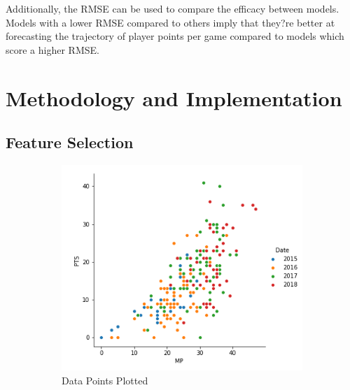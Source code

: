 \documentclass[a4paper,11pt,twoside]{article}
\begin{document}
Additionally, the RMSE can be used to compare the efficacy between models. Models with a lower RMSE compared to others imply that they?re better at forecasting the trajectory of player points per game compared to models which score a higher RMSE.



\newpage

\section{Methodology and Implementation}

\subsection{Feature Selection}

\begin{figure} [h!]
  \centering
  \begin{subfigure}[b]{0.4\textwidth}
    \includegraphics[width=\textwidth]{pairplot1.png}
    \caption{Data Points Plotted}
    \label{fig:1}
  \end{subfigure}
  \begin{subfigure}[b]{0.4\textwidth}

\end{subfigure}
\end{figure}
\end{document}

